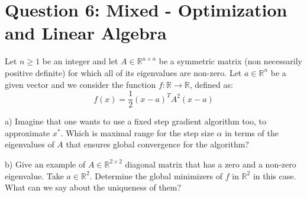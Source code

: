 \documentclass[12pt]{article}
\begin{document}
	\section*{Question 6: Mixed - Optimization and Linear Algebra}
		Let $n \geq 1$ be an integer and let $A \in \mathbb{R}^{n \times n}$ be a symmetric matrix (non necessarily positive definite) for which all of its eigenvalues are non-zero. Let $a \in \mathbb{R}^n$ be a given vector and we consider the function $f:\mathbb{R} \rightarrow \mathbb{R}$, defined as:
	\begin{equation}
		f(x) = \frac{1}{2}(x-a)^TA^2(x-a)
	\end{equation}
	
	a) Imagine that one wants to use a fixed step gradient algorithm too, to approximate $x^*$. Which is maximal range for the step size $\alpha$ in terms of the eigenvalues of $A$ that ensures global convergence for the algorithm?
	
	b) Give an example of $A \in \mathbb{R}^{2 \times 2}$ diagonal matrix that has a zero and a non-zero eigenvalue. Take $a \in \mathbb{R}^2$. Determine the global minimizers of $f$ in $\mathbb{R}^2$ in this case. What can we say about the uniqueness of them?
	
\end{document}
